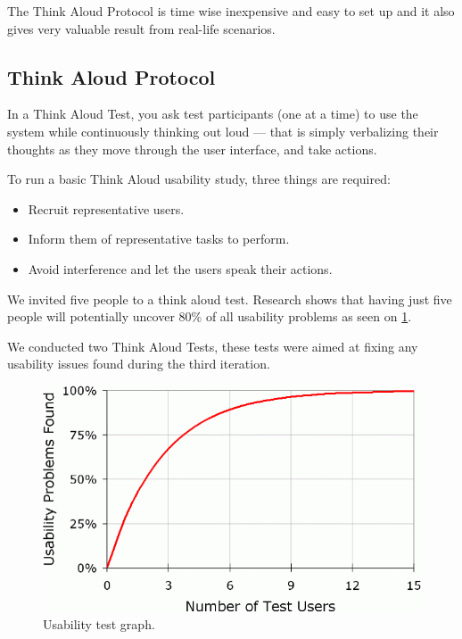 The Think Aloud Protocol is time wise inexpensive and easy to set up and it also gives very valuable result from real-life scenarios.

\subsection{Think Aloud Protocol}
In a Think Aloud Test, you ask test participants (one at a time) to use the system while continuously thinking out loud --- that is  simply verbalizing their thoughts as they move through the user interface, and take actions.

To run a basic Think Aloud usability study, three things are required:

\begin{itemize}
\item Recruit representative users.
\item Inform them of representative tasks to perform.
\item Avoid interference and let the users speak their actions.
\end{itemize}

We invited five people to a think aloud test. Research shows that having just five people will potentially uncover 80\% of all usability problems \cite{jakobnielsen2000fiveusers} as seen on \ref{fig:usabilitycurve}.

We conducted two Think Aloud Tests, these tests were aimed at fixing any usability issues found during the third iteration.

\begin{figure}[ht]
\centering
\includegraphics[width=\columnwidth]{usabilitycurve.png}
\caption{Usability test graph.}
\label{fig:usabilitycurve}
\end{figure}

